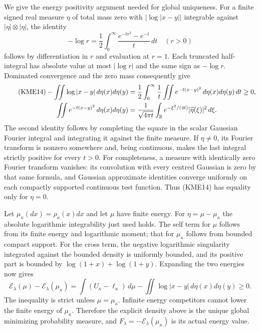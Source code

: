 We give the energy positivity argument needed for global uniqueness.
For a finite signed real measure $\eta$ of total mass zero with
$|\log|x-y||$ integrable against $|\eta|\otimes|\eta|$, the identity
\begin{equation}\tag{KME13}
 -\log r=\frac12\int_0^\infty
           \frac{e^{-tr^2}-e^{-t}}t\,dt\quad(r>0)
\end{equation}
follows by differentiation in $r$ and evaluation at $r=1$.
Each truncated half-integral has absolute value at most $|\log r|$
and the same sign as $-\log r$. Dominated convergence and the zero
mass consequently give
\begin{align}\tag{KME14}
 -\iint\log|x-y|\,d\eta(x)d\eta(y)
 &=\frac12\int_0^\infty\frac1t
               \iint e^{-t(x-y)^2}\,d\eta(x)d\eta(y)\,dt\geq0,\\
 \iint e^{-t(x-y)^2}\,d\eta(x)d\eta(y)
 &=\frac1{\sqrt{4\pi t}}\int_{\mathbb R}
       e^{-\xi^2/(4t)}|\widehat\eta(\xi)|^2\,d\xi.\notag
\end{align}
The second identity follows by completing the square in the scalar
Gaussian Fourier integral and integrating it against the finite measure.
If $\eta\ne0$, its Fourier transform is nonzero somewhere and, being
continuous, makes the last integral strictly positive for every $t>0$.
For completeness, a measure with identically zero Fourier transform
vanishes: its convolution with every centred Gaussian is zero by that
same formula, and Gaussian approximate identities converge uniformly on
each compactly supported continuous test function.  Thus (KME14)
has equality only for $\eta=0$.

Let $\mu_\kappa(dx)=\rho_\kappa(x)dx$ and let $\mu$ have finite energy.
For $\eta=\mu-\mu_\kappa$ the absolute logarithmic integrability just used
holds. The self term for $\mu$ follows from its finite energy and
logarithmic moment; that for $\mu_\kappa$ follows from bounded compact
support. For the cross term, the negative logarithmic singularity
integrated against the bounded density is uniformly bounded, and its
positive part is bounded by $\log(1+x)+\log(1+y)$.
Expanding the two energies now gives
\begin{equation}\tag{KME15}
 \mathcal E_\lambda(\mu)-\mathcal E_\lambda(\mu_\kappa)
 =\int(U_\kappa-\ell_\kappa)\,d\mu
                -\iint\log|x-y|\,d\eta(x)d\eta(y)\geq0.
\end{equation}
The inequality is strict unless $\mu=\mu_\kappa$. Infinite energy
competitors cannot lower the finite energy of $\mu_\kappa$. Therefore the
explicit density above is the unique global minimizing probability
measure, and $F_\lambda=-\mathcal E_\lambda(\mu_\kappa)$ is its actual
energy value.

